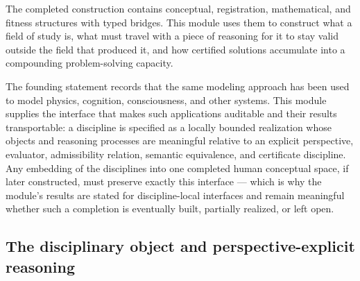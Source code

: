 \documentclass[11pt]{article}
\theoremstyle{definition}
\begin{document}
The completed construction contains conceptual, registration, mathematical, and fitness structures with typed bridges. This module uses them to construct what a field of study is, what must travel with a piece of reasoning for it to stay valid outside the field that produced it, and how certified solutions accumulate into a compounding problem-solving capacity.

The founding statement records that the same modeling approach has been used to model physics, cognition, consciousness, and other systems. This module supplies the interface that makes such applications auditable and their results transportable: a discipline is specified as a locally bounded realization whose objects and reasoning processes are meaningful relative to an explicit perspective, evaluator, admissibility relation, semantic equivalence, and certificate discipline. Any embedding of the disciplines into one completed human conceptual space, if later constructed, must preserve exactly this interface --- which is why the module's results are stated for discipline-local interfaces and remain meaningful whether such a completion is eventually built, partially realized, or left open.

\subsection{The disciplinary object and perspective-explicit reasoning}
\end{document}
